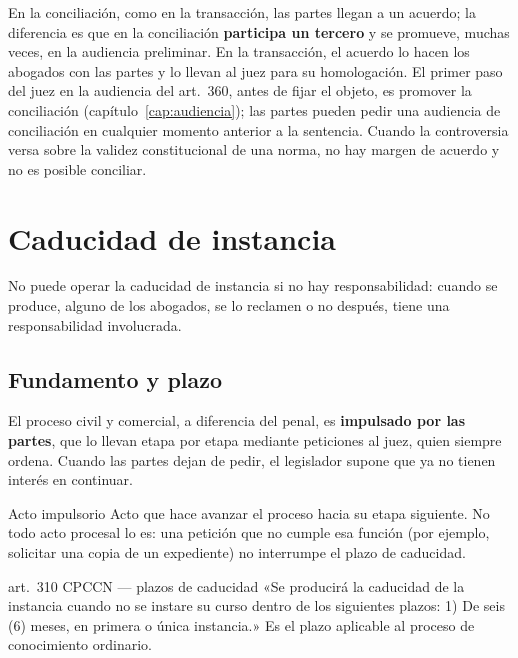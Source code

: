 \documentclass[12pt,oneside]{book}
\begin{document}
En la conciliación, como en la transacción, las partes llegan a un acuerdo; la diferencia es que en la conciliación \textbf{participa un tercero} y se promueve, muchas veces, en la audiencia preliminar. En la transacción, el acuerdo lo hacen los abogados con las partes y lo llevan al juez para su homologación. El primer paso del juez en la audiencia del art.~360, antes de fijar el objeto, es promover la conciliación (capítulo~\ref{cap:audiencia}); las partes pueden pedir una audiencia de conciliación en cualquier momento anterior a la sentencia. Cuando la controversia versa sobre la validez constitucional de una norma, no hay margen de acuerdo y no es posible conciliar.

\section{Caducidad de instancia}\label{sec:caducidad-instancia}

\begin{advertencia}
No puede operar la caducidad de instancia si no hay responsabilidad: cuando se produce, alguno de los abogados, se lo reclamen o no después, tiene una responsabilidad involucrada.
\end{advertencia}

\subsection{Fundamento y plazo}

El proceso civil y comercial, a diferencia del penal, es \textbf{impulsado por las partes}, que lo llevan etapa por etapa mediante peticiones al juez, quien siempre ordena. Cuando las partes dejan de pedir, el legislador supone que ya no tienen interés en continuar.

\begin{definicion}{Acto impulsorio}
Acto que hace avanzar el proceso hacia su etapa siguiente. No todo acto procesal lo es: una petición que no cumple esa función (por ejemplo, solicitar una copia de un expediente) no interrumpe el plazo de caducidad.
\end{definicion}

\begin{regla}{art.~310 CPCCN --- plazos de caducidad}
«Se producirá la caducidad de la instancia cuando no se instare su curso dentro de los siguientes plazos: 1) De seis (6) meses, en primera o única instancia.» Es el plazo aplicable al proceso de conocimiento ordinario.
\end{regla}
\end{document}
